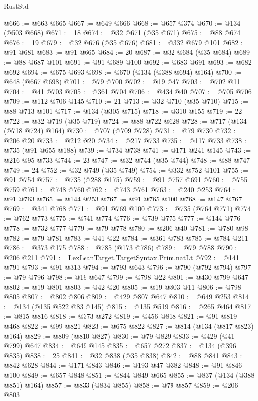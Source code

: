 \begin{lexlean}{RustStd}
\begin{coremodule}
@666 := @663 @665
@667 := @649 @666
@668 := @657 @374
@670 := @134 (@503 @668)
@671 := 18
@674 := @32 @671 (@35 @671)
@675 := @88 @674
@676 := 19
@679 := @32 @676 (@35 @676)
@681 := @332 @679 @101
@682 := @91 @681
@683 := @91 @665
@684 := 20
@687 := @32 @684 (@35 @684)
@689 := @88 @687 @101
@691 := @91 @689 @100
@692 := @683 @691
@693 := @682 @692
@694 := @675 @693
@698 := @670 (@134 (@388 @694) @164)
@700 := @648 (@667 @698)
@701 := @79 @700
@702 := @19 @47
@703 := @702 @11
@704 := @41 @703
@705 := @361 @704
@706 := @434 @40
@707 := @705 @706
@709 := @112 @706 @145
@710 := 21
@713 := @32 @710 (@35 @710)
@715 := @88 @713 @101
@717 := @134 (@305 @715)
@718 := @310 @155
@719 := 22
@722 := @32 @719 (@35 @719)
@724 := @88 @722 @628
@728 := @717 (@134 (@718 @724) @164)
@730 := @707 (@709 @728)
@731 := @79 @730
@732 := @206 @20
@733 := @212 @20
@734 := @217 @733
@735 := @117 @733
@738 := @735 (@91 @655 @188)
@739 := @734 @738
@741 := @171 @241 @145
@743 := @216 @95 @733
@744 := 23
@747 := @32 @744 (@35 @744)
@748 := @88 @747
@749 := 24
@752 := @32 @749 (@35 @749)
@754 := @332 @752 @101
@755 := @91 @754
@757 := @735 (@288 @175)
@759 := @91 @757 @691
@760 := @755 @759
@761 := @748 @760
@762 := @743 @761
@763 := @240 @253
@764 := @91 @763
@765 := @144 @253
@767 := @91 @765 @100
@768 := @147 @767
@769 := @341 @768
@771 := @91 @769 @100
@773 := @735 (@764 @771)
@774 := @762 @773
@775 := @741 @774
@776 := @739 @775
@777 := @144 @776
@778 := @732 @777
@779 := @79 @778
@780 := @206 @40
@781 := @780 @98
@782 := @79 @781
@783 := @41 @22
@784 := @361 @783
@785 := @784 @211
@786 := @373 @175
@788 := @785 (@173 @786)
@789 := @79 @788
@790 := @206 @211
@791 := LexLeanTarget.TargetSyntax.Prim.natLt
@792 := @141 @791
@793 := @91 @313
@794 := @793 @643
@796 := @790 (@792 @794)
@797 := @79 @796
@798 := @19 @647
@799 := @798 @22
@801 := @430 @799 @647
@802 := @19 @801
@803 := @42 @20
@805 := @19 @803 @11
@806 := @798 @805
@807 := @802 @806
@809 := @429 @807 @647
@810 := @649 @253
@814 := @134 (@135 @522 @83 @145)
@815 := @135 @519
@816 := @265 @464
@817 := @815 @816
@818 := @373 @272
@819 := @456 @818
@821 := @91 @819 @468
@822 := @99 @821
@823 := @675 @822
@827 := @814 (@134 (@817 @823) @164)
@829 := @809 (@810 @827)
@830 := @79 @829
@833 := @429 (@41 @799) @647
@834 := @649 @145
@835 := @657 @272
@837 := @134 (@396 @835)
@838 := 25
@841 := @32 @838 (@35 @838)
@842 := @88 @841
@843 := @842 @628
@844 := @171 @843
@846 := @193 @47 @382
@848 := @91 @846 @100
@849 := @657 @848
@851 := @844 @849 @665
@855 := @837 (@134 (@388 @851) @164)
@857 := @833 (@834 @855)
@858 := @79 @857
@859 := @206 @803

\end{coremodule}
\end{lexlean}
